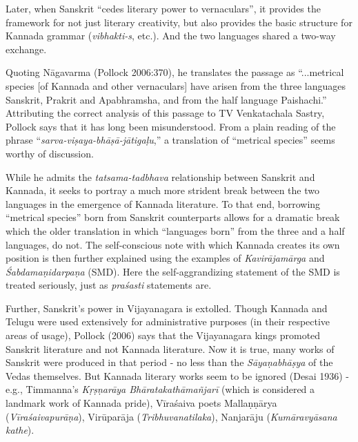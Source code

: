 Later, when Sanskrit “cedes literary power to vernaculars”, it provides the framework for not just literary creativity, but also provides the basic structure for Kannada grammar ({\sl vibhakti-s}, etc.). And the two languages shared a two-way exchange. 

Quoting Nāgavarma (Pollock 2006:370), he translates the passage as “...metrical species [of Kannada and other vernaculars] have arisen from the three languages Sanskrit, Prakrit and Apabhramsha, and from the half language Paishachi.” Attributing the correct analysis of this passage to TV Venkatachala Sastry, Pollock says that it has long been misunderstood. From a plain reading of the phrase “{\sl sarva-viṣaya-bhāṣā-jātigaḷu},” a translation of “metrical species” seems worthy of discussion. 

While he admits the {\sl tatsama-tadbhava} relationship between Sanskrit and Kannada, it seeks to portray a much more strident break between the two languages in the emergence of Kannada literature. To that end, borrowing “metrical species” born from Sanskrit counterparts allows for a dramatic break which the older translation in which “languages born” from the three and a half languages, do not. The self-conscious note with which Kannada creates its own position is then further explained using the examples of {\sl Kavirājamārga} and {\sl Śabdamaṇidarpaṇa} (SMD). Here the self-aggrandizing statement of the SMD is treated seriously, just as {\sl praśasti} statements are. 

Further, Sanskrit’s power in Vijayanagara is extolled. Though Kannada and Telugu were used extensively for administrative purposes (in their respective areas of usage), Pollock (2006) says that the Vijayanagara kings promoted Sanskrit literature and not Kannada literature. Now it is true, many works of Sanskrit were produced in that period - no less than the {\sl Sāyaṇabhāṣya} of the Vedas themselves. But Kannada literary works seem to be ignored (Desai 1936) - e.g., Timmanna’s {\sl Kṛṣṇarāya Bhāratakathāmañjarī} (which is considered a landmark work of Kannada pride), Vīraśaiva poets Mallaṇṇārya ({\sl Vīraśaivapurāṇa}), Virūparāja ({\sl Tribhuvanatilaka}), Nanjarāju ({\sl Kumāravyāsana kathe}).

